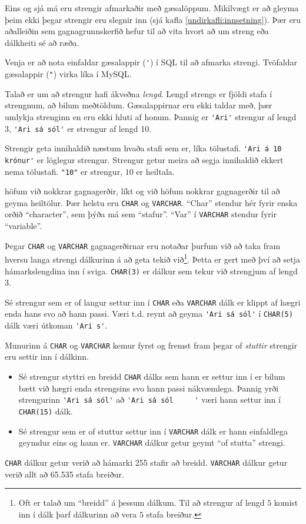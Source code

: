 Eins og sjá má eru strengir afmarkaðir með gæsalöppum. Mikilvægt er að gleyma þeim ekki þegar strengir eru slegnir inn (sjá kafla \ref{undirkafli:innsetning}). Þær eru aðalleiðin sem gagnagrunnskerfið hefur til að vita hvort að um streng eða dálkheiti sé að ræða. 

Venja er að nota einfaldar gæsalappir (\verb|'|) í SQL til að afmarka strengi. Tvöfaldar gæsalappir (\verb|"|) virka líka í MySQL.

Talað er um að strengur hafi ákveðna \emph{lengd}. Lengd strengs er fjöldi stafa í strengnum, að bilum meðtöldum. Gæsalappirnar eru ekki taldar með, þær umlykja strenginn en eru ekki hluti af honum. Þannig er \verb|'Ari'| strengur af lengd 3, \verb|'Ari sá sól'| er strengur af lengd 10.

Strengir geta innihaldið næstum hvaða stafi sem er, líka tölustafi. \verb|'Ari á 10 krónur'| er löglegur strengur. Strengur getur meira að segja innihaldið ekkert nema tölustafi. \verb|"10"| er strengur, $10$ er heiltala.

 höfum við nokkrar gagnagerðir, líkt og við höfum nokkrar gagnagerðir til að geyma heiltölur. Þær helstu eru \verb|CHAR| og \verb|VARCHAR|. ``Char'' stendur hér fyrir enska orðið ``character'', sem þýða má sem ``stafur''. ``Var'' í \verb|VARCHAR| stendur fyrir ``variable''. 

Þegar \verb|CHAR| og \verb|VARCHAR| gagnagerðirnar eru notaðar þurfum við að taka fram hversu langa strengi dálkurinn á að geta tekið við\footnote{Oft er talað um ``breidd'' á þessum dálkum. Til að strengur af lengd $5$ komist inn í dálk þarf dálkurinn að vera $5$ stafa breiður.}. Þetta er gert með því að setja hámarkslengdina inn í sviga. \verb|CHAR(3)| er dálkur sem tekur við strengjum af lengd 3.

Sé strengur sem er of langur settur inn í \verb|CHAR| eða \verb|VARCHAR| dálk er klippt af hægri enda hans svo að hann passi. Væri t.d. reynt að geyma \verb|'Ari sá sól'| í \verb|CHAR(5)| dálk væri útkoman \verb|'Ari s'|. 

Munurinn á \verb|CHAR| og \verb|VARCHAR| kemur fyrst og fremst fram þegar of \emph{stuttir} strengir eru settir inn í dálkinn. 
\begin{itemize}
 \item Sé strengur styttri en breidd \verb|CHAR| dálks sem hann er settur inn í er bilum bætt við hægri enda strengsins svo hann passi nákvæmlega. Þannig yrði strengurinn \verb|'Ari sá sól'| að \verb|'Ari sá sól     '| væri hann settur inn í \verb|CHAR(15)| dálk.
 \item Sé strengur sem er of stuttur settur inn í \verb|VARCHAR| dálk er hann einfaldlega geymdur eins og hann er. \verb|VARCHAR| dálkur getur geymt ``of stutta'' strengi.
\end{itemize}
\verb|CHAR| dálkur getur verið að hámarki 255 stafir að breidd. \verb|VARCHAR| dálkur getur verið allt að 65.535 stafa breiður.

